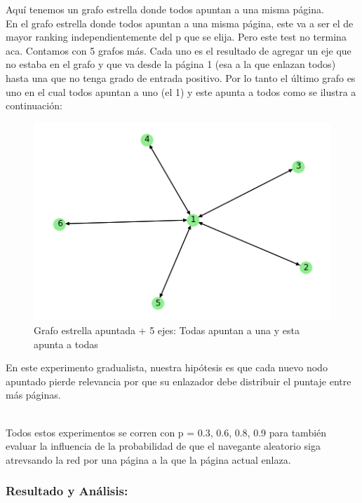 Aquí tenemos un grafo estrella donde todos apuntan a una misma página. \\

En el grafo estrella donde todos apuntan a una misma página, este va a ser el de mayor ranking independientemente del p que se elija. Pero este test no termina aca. Contamos con 5 grafos más. Cada uno es el resultado de agregar un eje que no estaba en el grafo y que va desde la página 1 (esa a la que enlazan todos) hasta una que no tenga grado de entrada positivo. Por lo tanto el último grafo es uno en el cual todos apuntan a uno (el 1) y este apunta a todos como se ilustra a continuación: \\

\begin{figure}[H]
   \begin{center}
     \includegraphics{img/prueba_estrella_apuntada+5.png} 
  \end{center}
\caption{Grafo estrella apuntada + 5 ejes: Todas apuntan a una y esta apunta a todas} \label{fig:exp3-estrella}
\end{figure}

En este experimento gradualista, nuestra hipótesis es que cada nuevo nodo apuntado pierde relevancia por que su enlazador debe distribuir el puntaje entre más páginas. \\\

Todos estos experimentos se corren con p = 0.3, 0.6, 0.8, 0.9 para también evaluar la influencia de la probabilidad de que el navegante aleatorio siga atrevsando la red por una página a la que la página actual enlaza.

\newpage
\subsubsection{Resultado y Análisis: }

